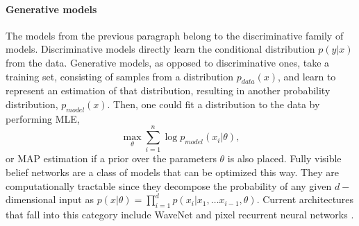\paragraph{Generative models} 
The models from the previous paragraph belong to the discriminative family of models. Discriminative models directly learn the conditional distribution $p(y|x)$ from the data.
Generative models, as opposed to discriminative ones, take a training set, consisting of samples from a distribution $p_{data}(x)$, and learn to represent an estimation of that distribution, resulting in another probability distribution, $p_{model}(x)$. Then, one could fit a distribution to the data by performing MLE,
$$
\max_{\theta} \sum_{i=1}^n \log p_{model} (x_i | \theta),
$$
or MAP estimation if a prior over the parameters $\theta$ is also placed. Fully visible belief networks \parencite{10.5555/2998828.2998922} are a class of models that can be optimized this way. They are computationally tractable since they decompose the probability of any given $d-$dimensional input as $p(x | \theta) = \prod_{i=1}^d p(x_i | x_1 , \ldots x_{i-1}, \theta)$. Current architectures that fall into this category include WaveNet \parencite{oord2016wavenet} and pixel recurrent neural networks \parencite{pmlr-v48-oord16}. %

